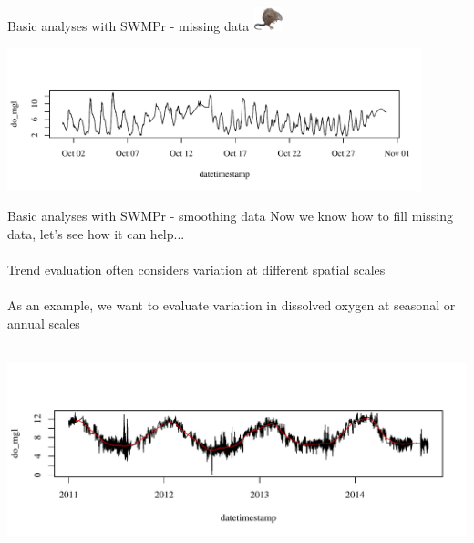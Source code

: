 \documentclass[xcolor=dvipsnames]{beamer}\usepackage[]{graphicx}\usepackage[]{color}
\newenvironment{knitrout}{}{} %
\begin{document}
\begin{frame}[fragile]{Basic analyses with SWMPr - missing data \includegraphics[width = 0.065\textwidth]{imgs/swmprat.png}}
\begin{knitrout}
\end{knitrout}
\vspace{-0.5in}
\begin{knitrout}\scriptsize
{}\color{fgcolor}

{\centering \includegraphics[width=0.9\textwidth]{figure/unnamed-chunk-10-1} 

}



\end{knitrout}
\end{frame}

\begin{frame}[fragile]{Basic analyses with SWMPr - smoothing data}
Now we know how to fill missing data, let's see how it can help...\\~\\
Trend evaluation often considers variation at different spatial scales \\~\\
As an example, we want to evaluate variation in dissolved oxygen at seasonal or annual scales \\~\\
\begin{knitrout}\scriptsize
{}\color{fgcolor}

{\centering \includegraphics[width=\textwidth]{figure/unnamed-chunk-11-1} 

}



\end{knitrout}
\end{frame}
\end{document}
